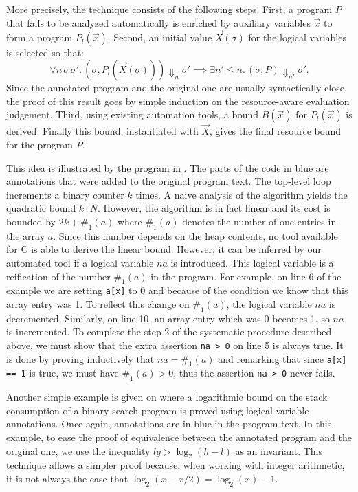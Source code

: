 \documentclass[nocopyrightspace,preprint,pldi]{sigplanconf-pldi15}
\newcommand{\pref}[1]{\prettyref{#1}}
\begin{document}
More precisely, the technique consists of the following steps. First,
a program $P$ that fails to be analyzed automatically is enriched by
auxiliary variables $\vec x$ to form a program
$P_l(\vec x)$.  Second, an initial value $\vec X(\sigma)$ for the
logical variables is selected so that:
$$
\forall n\, \sigma\, \sigma'.\,
  (\sigma, P_l(\vec X(\sigma))) \Downarrow_n \sigma'
    {\implies}
  \exists n' {\le} n.\,
    (\sigma, P) \Downarrow_{n'} \sigma'.
$$
Since the annotated program and the original one are usually
syntactically close, the proof of this result goes
by simple induction on the resource-aware evaluation judgement.
Third, using existing automation tools, a bound $B(\vec x)$ for
$P_l(\vec x)$ is derived.  Finally this bound, instantiated with
$\vec X$, gives the final resource bound for the program $P$.

This idea is illustrated by the program in \pref{fig:xmplincaux}.
The parts of the code in blue are annotations that were added
to the original program text.  The top-level loop increments
a binary counter $k$ times.  A naive analysis of
the algorithm yields the quadratic bound $k \cdot N$.
However, the algorithm is in fact linear and its cost is bounded
by $2k + \#_1(a)$ where $\#_1(a)$ denotes
the number of one entries in the array $a$.  Since this
number depends on the heap contents, no tool available
for C is able to derive the linear bound.  However, it can be inferred
by our automated tool if a logical variable $na$ is introduced.
This logical variable is a reification of the
number $\#_1(a)$ in the program.  For example, on line 6 of the example
we are setting \lstinline{a[x]} to 0 and because of the condition we
know that this array entry was 1.  To reflect this change on
$\#_1(a)$, the logical variable $na$ is decremented.
Similarly, on line 10, an array entry which was 0 becomes 1, so
$na$ is incremented.  To complete the step 2 of the systematic
procedure described above, we must show that the extra assertion
\lstinline{na > 0} on line 5 is always true.  It
is done by proving inductively that $na = \#_1(a)$
and remarking that since \lstinline{a[x] == 1} is true, we must have
$\#_1(a) > 0$, thus the assertion \lstinline{na > 0} never fails. %

Another simple example is given on \pref{fig:xmplbsaux} where
a logarithmic bound on the stack consumption of a binary search
program is proved using logical variable annotations.  Once again,
annotations are in blue in the program text.  In this example,
to ease the proof of equivalence between the annotated program
and the original one, we use the inequality $lg >
\log_2(h-l)$ as an invariant.  This technique allows a simpler
proof because, when working with integer arithmetic, it is not always
the case that $\log_2(x-x/2) = \log_2(x)-1$.
\end{document}
